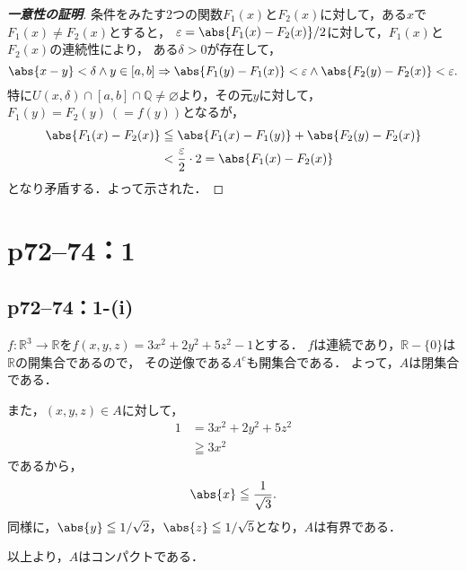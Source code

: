 \documentclass[a4paper,10pt,fleqn]{ltjsarticle}
\begin{document}
\begin{leftbar}
    \begin{proof}[\textup{\textbf{一意性の証明}}]
        条件をみたす2つの関数$F_1 (x)$と$F_2(x)$に対して，ある$x$で$F_1(x) \ne F_2(x)$とすると，
        $\varepsilon = \abs{F_1(x) - F_2(x)}/2$に対して，$F_1(x)$と$F_2(x)$の連続性により，
        ある$\delta >0$が存在して，
        \[
            \abs{x-y}<\delta \land y \in [a,b] \Rightarrow \abs{F_1(y)-F_1(x)}<\varepsilon \land  \abs{F_2(y)-F_2(x)}<\varepsilon.
        \]
        特に$ U (x,\delta) \cap [a,b] \cap \mathbb{Q} \ne \varnothing$より，その元$y$に対して，
        $F_1 (y)=F_2(y)~(=f(y))$となるが，
        \begin{align*}
            \abs{F_1(x)-F_2(x)} & \leqq \abs{F_1(x)-F_1(y)} + \abs{F_2(y)-F_2(x)}          \\
                                & < \frac{\varepsilon}{2} \cdot 2  = \abs{F_1(x) - F_2(x)}
        \end{align*}
        となり矛盾する．よって示された．
    \end{proof}
\end{leftbar}

\newpage

\section*{p72--74：1}


\subsection*{p72--74：1-(i)}

\begin{tleftbar}
    $ f\colon \mathbb{R}^3 \to \mathbb{R}$を$f(x,y,z)=3x^2 + 2y^2 + 5z^2 -1$とする．
    $f$は連続であり，$\mathbb{R} -\{ 0 \}$は$\mathbb{R}$の開集合であるので，
    その逆像である$A^c$も開集合である．
    よって，$A$は閉集合である．

    また，$(x,y,z) \in A$に対して，
    \begin{align*}
        1 & = 3x^2 + 2y^2 + 5z^2 \\
          & \geqq 3x^2
    \end{align*}
    であるから，
    \[
        \abs{x} \leqq \frac{1}{\sqrt{3}}.
    \]
    同様に，$ \abs{y} \leqq 1/\sqrt{2}$，$\abs{z} \leqq 1/\sqrt{5}$となり，$A$は有界である．

    以上より，$A$はコンパクトである．
\end{tleftbar}
\end{document}
